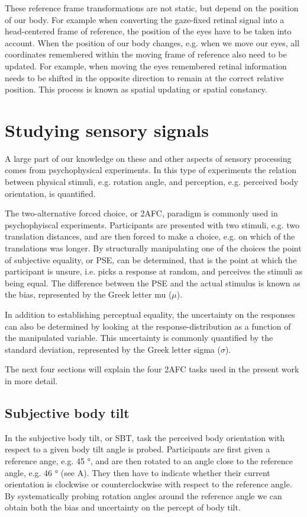 These reference frame transformations are not static, but depend on the position of our body. For example when converting the gaze-fixed retinal signal into a head-centered frame of reference, the position of the eyes have to be taken into account. When the position of our body changes, e.g. when we move our eyes, all coordinates remembered within the moving frame of reference also need to be updated. For example, when moving the eyes remembered retinal information needs to be shifted in the opposite direction to remain at the correct relative position. This process is known as spatial updating or spatial constancy.

\section{Studying sensory signals}
A large part of  our knowledge on these and other aspects of sensory processing comes from psychophysical experiments. In this type of experiments the relation between physical stimuli, e.g. rotation angle, and perception, e.g. perceived body orientation, is quantified.

The two-alternative forced choice, or 2AFC, paradigm is commonly used in psychophyiscal experiments. Participants are presented with two stimuli, e.g. two translation distances, and are then forced to make a choice, e.g. on which of the translations was longer. By structurally manipulating one of the choices the point of subjective equality, or PSE, can be determined, that is the point at which the participant is unsure, i.e. picks a response at random, and perceives the stimuli as being equal. The difference between the PSE and the actual stimulus is known as the bias, represented by the Greek letter mu ($\mu$).

In addition to establishing perceptual equality, the uncertainty on the responses can also be determined by looking at the response-distribution as a function of the manipulated variable. This uncertainty is commonly quantified by the standard deviation, represented by the Greek letter sigma ($\sigma$).

The next four sections will explain the four 2AFC tasks used in the present work in more detail.

\subsection{Subjective body tilt}
In the subjective body tilt, or SBT, task the perceived body orientation with respect to a given body tilt angle is probed. Participants are first given a reference ange, e.g. 45 \si{\degree}, and are then rotated to an angle close to the reference angle, e.g. 46 \si{\degree} (see A). They then have to indicate whether their current orientation is clockwise or counterclockwise with respect to the reference angle. By systematically probing rotation angles around the reference angle we can obtain both the bias and uncertainty on the percept of body tilt.

